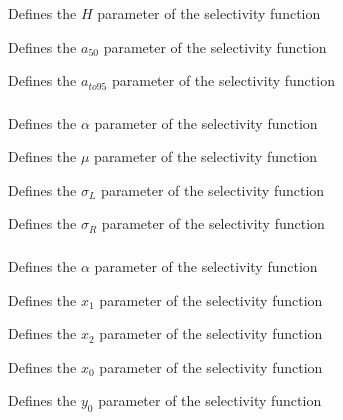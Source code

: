  {Defines the $H$ parameter of the selectivity function}

 {Defines the $a_{50}$ parameter of the selectivity function}

 {Defines the $a_{to95}$ parameter of the selectivity function}

\subsubsection[Double-normal]{}

 {Defines the $\alpha$ parameter of the selectivity function}

 {Defines the $\mu$ parameter of the selectivity function}

 {Defines the $\sigma_L$ parameter of the selectivity function}

 {Defines the $\sigma_R$ parameter of the selectivity function}

\subsubsection[Double-exponential]{}

 {Defines the $\alpha$ parameter of the selectivity function}

 {Defines the $x_1$ parameter of the selectivity function}

 {Defines the $x_2$ parameter of the selectivity function}

 {Defines the $x_0$ parameter of the selectivity function}

 {Defines the $y_0$ parameter of the selectivity function}

